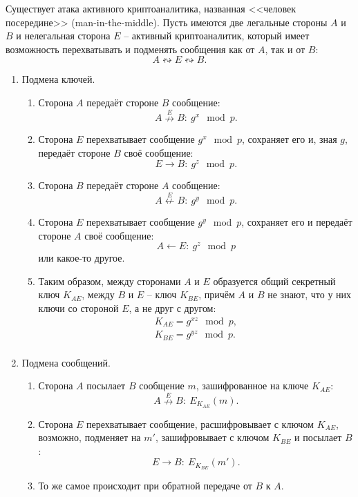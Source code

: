 Существует атака активного криптоаналитика, названная <<человек посередине>> (man-in-the-middle). Пусть имеются две легальные стороны $A$ и $B$ и нелегальная сторона $E$ -- активный криптоаналитик, который имеет возможность перехватывать и подменять сообщения как от $A$, так и от $B$:
    \[ A \leftrightsquigarrow E \leftrightsquigarrow B. \]

\begin{enumerate}
    \item Подмена ключей.
        \begin{enumerate}
            \item Сторона $A$ передаёт стороне $B$ сообщение:
                \[ A \overset{E}{\nrightarrow} B: ~ g^x \mod p. \]
            \item Сторона $E$ перехватывает сообщение $g^x \mod p$, сохраняет его и, зная $g$, передаёт стороне $B$ своё сообщение:
                \[ E \rightarrow B: ~ g^z \mod p. \]
            \item Сторона $B$ передаёт стороне $A$ сообщение:
                \[ A \overset{E}{\nleftarrow} B: ~ g^y \mod p. \]
            \item Сторона $E$ перехватывает сообщение $g^y \mod p$, сохраняет его и передаёт стороне $A$ своё сообщение:
                \[ A \leftarrow E: ~ g^z \mod p \]
                или какое-то другое.
            \item Таким образом, между сторонами $A$ и $E$ образуется общий секретный ключ $K_{AE}$, между $B$ и $E$ -- ключ $K_{BE}$, причём $A$ и $B$ не знают, что у них ключи со стороной $E$, а не друг с другом:
                \[ \begin{array} {l}
                    K_{AE} = g^{xz} \mod p, \\
                    K_{BE} = g^{yz} \mod p. \\
                \end{array} \]

        \end{enumerate}
    \item Подмена сообщений.
        \begin{enumerate}
            \item Сторона $A$ посылает $B$ сообщение $m$, зашифрованное на ключе $K_{AE}$:
                \[ A \overset{E}{\nrightarrow} B: ~ E_{K_{AE}}(m). \]
            \item Сторона $E$ перехватывает сообщение, расшифровывает с ключом $K_{AE}$, возможно, подменяет на $m'$, зашифровывает с ключом $K_{BE}$ и посылает $B$:
                \[ E \rightarrow B: ~ E_{K_{BE}}(m'). \]
            \item То же самое происходит при обратной передаче от $B$ к $A$.
        \end{enumerate}
\end{enumerate}

